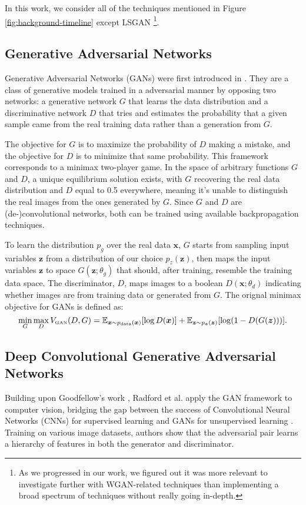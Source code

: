In this work, we consider all of the techniques mentioned in Figure \ref{fig:background-timeline} except LSGAN \footnote{As we progressed in our work, we figured out it was more relevant to investigate further with WGAN-related techniques than implementing a broad spectrum of techniques without really going in-depth.}.

\subsection{Generative Adversarial Networks} 
Generative Adversarial Networks (GANs) were first introduced in \cite{goodfellow2014generative}. They are a class of generative models trained in a adversarial manner by opposing two networks: a generative network $G$ that learns the data distribution and a discriminative network $D$ that tries and estimates the probability that a given sample came from the real training data rather than a generation from $G$. 
 
The objective for $G$ is to maximize the probability of $D$ making a mistake, and the objective for $D$ is to minimize that same probability. This framework corresponds to a minimax two-player game. In the space of arbitrary functions $G$ and $D$, a unique equilibrium solution exists, with $G$ recovering the real data distribution and $D$ equal to 0.5 everywhere, meaning it's unable to distinguish the real images from the ones generated by $G$. Since $G$ and $D$ are (de-)convolutional networks, both can be trained using available backpropagation techniques.

To learn the distribution $p_g$ over the real data $\bm{x}$, $G$ starts from sampling input variables $\bm{z}$ from a distribution of our choice $p_z(\bm{z})$, then maps the input variables $\bm{z}$ to space $G(\bm{z}; \theta_g)$ that should, after training, resemble the training data space. The discriminator, $D$, maps images to a boolean $D(\bm{x}; \theta_d)$ indicating whether images are from training data or generated from $G$. The orignal minimax objective for GANs is defined as:
\begin{equation}
\label{eq_gan}
\min_G \max_D V_{\text{\tiny GAN}}(D, G) = \mathbb{E}_{\bm{x} \sim p_{\text{data}}(\bm{x})}[\log D(\bm{x})] + \mathbb{E}_{\bm{z} \sim p_{\bm{z}}(\bm{z})}[\log (1 - D(G(\bm{z})))] .
\end{equation}

\subsection{Deep Convolutional Generative Adversarial Networks}
Building upon Goodfellow's work \cite{goodfellow2014generative}, Radford et al. apply the GAN framework to computer vision, bridging the gap between the success of Convolutional Neural Networks (CNNs) for supervised learning and GANs for unsupervised learning \cite{DBLP:journals/corr/RadfordMC15}. Training on various image datasets, authors show that the adversarial pair learns a hierarchy of features in both the generator and discriminator. 

